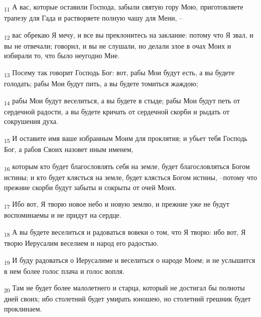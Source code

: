 \begin{tcolorbox}
\textsubscript{11} А вас, которые оставили Господа, забыли святую гору Мою, приготовляете трапезу для Гада и растворяете полную чашу для Мени, --
\end{tcolorbox}
\begin{tcolorbox}
\textsubscript{12} вас обрекаю Я мечу, и все вы преклонитесь на заклание: потому что Я звал, и вы не отвечали; говорил, и вы не слушали, но делали злое в очах Моих и избирали то, что было неугодно Мне.
\end{tcolorbox}
\begin{tcolorbox}
\textsubscript{13} Посему так говорит Господь Бог: вот, рабы Мои будут есть, а вы будете голодать; рабы Мои будут пить, а вы будете томиться жаждою;
\end{tcolorbox}
\begin{tcolorbox}
\textsubscript{14} рабы Мои будут веселиться, а вы будете в стыде; рабы Мои будут петь от сердечной радости, а вы будете кричать от сердечной скорби и рыдать от сокрушения духа.
\end{tcolorbox}
\begin{tcolorbox}
\textsubscript{15} И оставите имя ваше избранным Моим для проклятия; и убьет тебя Господь Бог, а рабов Своих назовет иным именем,
\end{tcolorbox}
\begin{tcolorbox}
\textsubscript{16} которым кто будет благословлять себя на земле, будет благословляться Богом истины; и кто будет клясться на земле, будет клясться Богом истины, --потому что прежние скорби будут забыты и сокрыты от очей Моих.
\end{tcolorbox}
\begin{tcolorbox}
\textsubscript{17} Ибо вот, Я творю новое небо и новую землю, и прежние уже не будут воспоминаемы и не придут на сердце.
\end{tcolorbox}
\begin{tcolorbox}
\textsubscript{18} А вы будете веселиться и радоваться вовеки о том, что Я творю: ибо вот, Я творю Иерусалим веселием и народ его радостью.
\end{tcolorbox}
\begin{tcolorbox}
\textsubscript{19} И буду радоваться о Иерусалиме и веселиться о народе Моем; и не услышится в нем более голос плача и голос вопля.
\end{tcolorbox}
\begin{tcolorbox}
\textsubscript{20} Там не будет более малолетнего и старца, который не достигал бы полноты дней своих; ибо столетний будет умирать юношею, но столетний грешник будет проклинаем.
\end{tcolorbox}
